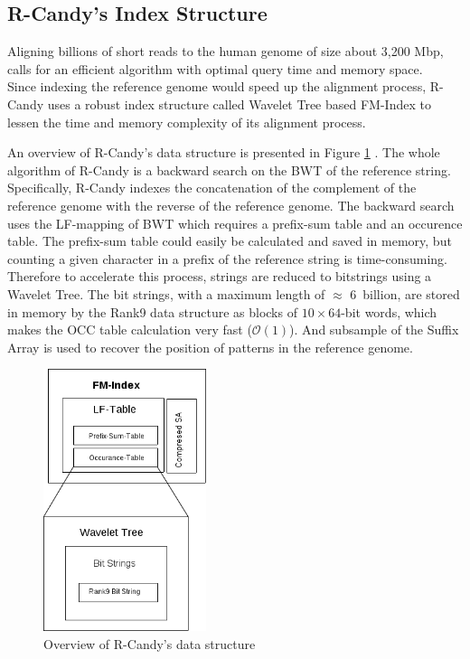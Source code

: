\documentclass[11pt,a4paper]{report}
\begin{document}
\subsection{R-Candy's Index Structure} 
\label{R-Candy's Index Structure}

Aligning billions of short reads to the human genome of size about 3,200 Mbp, 
calls for an efficient algorithm with optimal query time and memory space.\\ 
Since indexing the reference genome would speed up the alignment process, 
R-Candy uses a robust index structure called Wavelet Tree based FM-Index to 
lessen the time and memory complexity of its alignment process.

An overview of R-Candy's data structure is presented in Figure \ref{DSOverview}
\cite{Wavthesis}. The whole algorithm of R-Candy is a backward search on the 
BWT of the reference string. Specifically, R-Candy indexes the concatenation of
the complement of the reference genome with the reverse of the reference genome. 
The backward search uses the LF-mapping of BWT which requires a prefix-sum table
and an occurence table. The prefix-sum table could easily be calculated and saved 
in memory, but counting a given character in a prefix of the reference string
is time-consuming. Therefore to accelerate this process, strings are reduced to 
bitstrings using a  Wavelet Tree. The bit strings, with a maximum length of 
$\approx$ 6~billion, are stored in memory by the Rank9 data structure as blocks 
of $10 \times 64$-bit words, which makes the OCC table calculation very fast 
($\mathcal{O}(1)$). And subsample of the Suffix Array is used to recover the 
position of patterns in the reference genome.


\begin{figure}[H]
\centering
\includegraphics[width=4.75cm]{pictures/DSOverview2.png}
\caption{Overview of R-Candy's data structure }
\label{DSOverview}
\end{figure}
\end{document}
